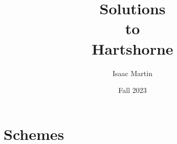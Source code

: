 

\title[Solutions to Algebraic Geometry by Robin Hartshorne]{\setlength{\parindent}{0pt}Solutions \\to \\Hartshorne} %
\author{Isaac Martin} %
\date{Fall 2023}



\maketitle
\tableofcontents %





\setcounter{chapter}{1}
\chapter{Schemes}
